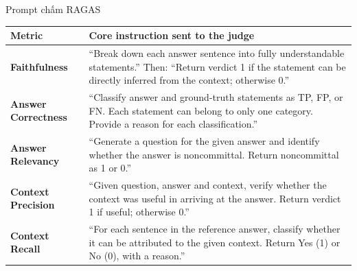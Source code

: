 \begin{frame}[t]{Prompt chấm RAGAS}
{\fontsize{9.2}{11.1}\selectfont
\setlength{\tabcolsep}{5pt}
\renewcommand{\arraystretch}{1.10}
\begin{tabularx}{\textwidth}{@{}p{34mm}L@{}}
\toprule
{}\textbf{Metric} & \textbf{Core instruction sent to the judge} \\\midrule
{}\textbf{Faithfulness} & ``Break down each answer sentence into fully understandable statements.'' Then: ``Return verdict 1 if the statement can be directly inferred from the context; otherwise 0.'' \\\midrule
{}\textbf{Answer Correctness} & ``Classify answer and ground-truth statements as TP, FP, or FN. Each statement can belong to only one category. Provide a reason for each classification.'' \\\midrule
{}\textbf{Answer Relevancy} & ``Generate a question for the given answer and identify whether the answer is noncommittal. Return noncommittal as 1 or 0.'' \\\midrule
{}\textbf{Context Precision} & ``Given question, answer and context, verify whether the context was useful in arriving at the answer. Return verdict 1 if useful; otherwise 0.'' \\\midrule
{}\textbf{Context Recall} & ``For each sentence in the reference answer, classify whether it can be attributed to the given context. Return Yes (1) or No (0), with a reason.'' \\\bottomrule
\end{tabularx}\par}
\end{frame}
